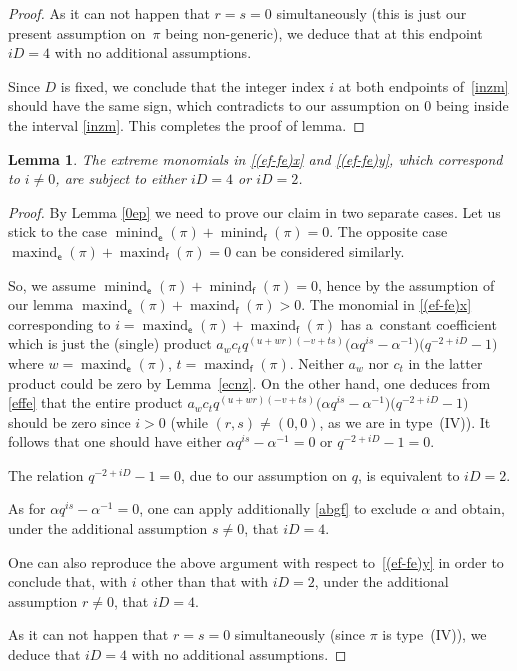 \documentclass[10pt,a4paper]{amsart}
\numberwithin{equation}{section}
\newtheorem{Lemma}[Theorem]{Lemma}
\begin{document}
\begin{proof}
As it can not happen that $r=s=0$ simultaneously (this is just our present assumption on~$\pi$ being non-generic), we deduce that at this endpoint $iD=4$ with no additional assumptions.

Since $D$ is fixed, we conclude that the integer index $i$ at both endpoints of~\eqref{inzm} should have the same sign, which contradicts to our assumption on $0$ being inside the interval \eqref{inzm}. This completes the proof of lemma.
\end{proof}

\begin{Lemma}\label{iD}The extreme monomials in \eqref{(ef-fe)x} and \eqref{(ef-fe)y}, which correspond to $i\ne 0$, are subject to either $iD=4$ or $iD=2$.
\end{Lemma}

\begin{proof} By Lemma \ref{0ep} we need to prove our claim in two separate cases. Let us stick to the case $\operatorname{minind}_\mathsf{e}(\pi)+\operatorname{minind}_\mathsf{f}(\pi)=0$. The opposite case $\operatorname{maxind}_\mathsf{e}(\pi)+\operatorname{maxind}_\mathsf{f}(\pi)=0$ can be considered similarly.

So, we assume $\operatorname{minind}_\mathsf{e}(\pi)+\operatorname{minind}_\mathsf{f}(\pi) =0$, hence by the assumption of our lemma \linebreak $\operatorname{maxind}_\mathsf{e}(\pi)+\operatorname{maxind}_\mathsf{f}(\pi)>0$. The monomial in \eqref{(ef-fe)x} corresponding to $i=\operatorname{maxind}_\mathsf{e}(\pi)+ \operatorname{maxind}_\mathsf{f}(\pi)$ has a~constant coefficient which is just the (single) product $a_wc_tq^{(u+wr)(-v+ts)}\big(\alpha q^{is}-\alpha^{-1}\big)\big(q^{-2+iD}-1\big)$ where $w=\operatorname{maxind}_\mathsf{e}(\pi)$, $t=\operatorname{maxind}_\mathsf{f}(\pi)$. Neither $a_w$ nor $c_t$ in the latter product could be zero by Lemma~\ref{ecnz}. On the other hand, one deduces from \eqref{effe} that the entire product $a_wc_tq^{(u+wr)(-v+ts)}\big(\alpha q^{is}-\alpha^{-1}\big)\big(q^{-2+iD}-1\big)$ should be zero since $i>0$ (while $(r,s)\ne(0,0)$, as we are in type~(IV)). It follows that one should have either $\alpha q^{is}-\alpha^{-1}=0$ or $q^{-2+iD}-1=0$.

The relation $q^{-2+iD}-1=0$, due to our assumption on $q$, is equivalent to $iD=2$.

As for $\alpha q^{is}-\alpha^{-1}=0$, one can apply additionally \eqref{abgf} to exclude $\alpha$ and obtain, under the additional assumption $s\ne 0$, that $iD=4$.

One can also reproduce the above argument with respect to~\eqref{(ef-fe)y} in order to conclude that, with $i$ other than that with $iD=2$, under the additional assumption $r\ne 0$, that $iD=4$.

As it can not happen that $r=s=0$ simultaneously (since $\pi$ is type~(IV)), we deduce that $iD=4$ with no additional assumptions.
\end{proof}
\end{document}

